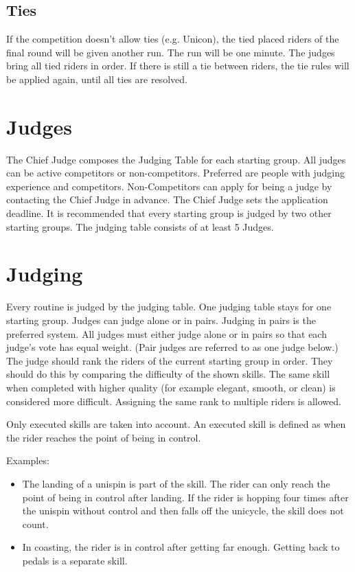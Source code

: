 \subsection{Ties}
If the competition doesn't allow ties (e.g. Unicon), the tied placed riders of the final round will be given another run.
The run will be one minute.
The judges bring all tied riders in order.
If there is still a tie between riders, the tie rules will be applied again, until all ties are resolved.

\section{Judges}
The Chief Judge composes the Judging Table for each starting group.
All judges can be active competitors or non-competitors.
Preferred are people with judging experience and competitors.
Non-Competitors can apply for being a judge by contacting the Chief Judge in advance.
The Chief Judge sets the application deadline.
It is recommended that every starting group is judged by two other starting groups.
The judging table consists of at least 5 Judges.

\section{Judging}
Every routine is judged by the judging table.
One judging table stays for one starting group.
Judges can judge alone or in pairs.
Judging in pairs is the preferred system.
All judges must either judge alone or in pairs so that each judge's vote has equal weight.
(Pair judges are referred to as one judge below.)
The judge should rank the riders of the current starting group in order.
They should do this by comparing the difficulty of the shown skills.
The same skill when completed with higher quality (for example elegant, smooth, or clean) is considered more difficult.
Assigning the same rank to multiple riders is allowed.

Only executed skills are taken into account.
An executed skill is defined as when the rider reaches the point of being in control.

Examples:

\begin{itemize}
\item The landing of a unispin is part of the skill.
The rider can only reach the point of being in control after landing.
If the rider is hopping four times after the unispin without control and then falls off the unicycle, the skill does not count.
\item In coasting, the rider is in control after getting far enough.
Getting back to pedals is a separate skill.
\end{itemize}

